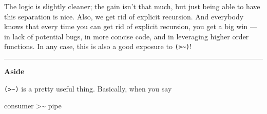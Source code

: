 \documentclass[]{article}
\newenvironment{Shaded}{}{}
\newcommand{\CommentTok}[1]{\textcolor[rgb]{0.38,0.63,0.69}{\textit{#1}}}
\newcommand{\DataTypeTok}[1]{\textcolor[rgb]{0.56,0.13,0.00}{#1}}
\newcommand{\FunctionTok}[1]{\textcolor[rgb]{0.02,0.16,0.49}{#1}}
\newcommand{\KeywordTok}[1]{\textcolor[rgb]{0.00,0.44,0.13}{\textbf{#1}}}
\newcommand{\NormalTok}[1]{#1}
\newcommand{\OperatorTok}[1]{\textcolor[rgb]{0.40,0.40,0.40}{#1}}
\newcommand{\OtherTok}[1]{\textcolor[rgb]{0.00,0.44,0.13}{#1}}
\begin{document}
\begin{Shaded}
\end{Shaded}

The logic is slightly cleaner; the gain isn't that much, but just being able to
have this separation is nice. Also, we get rid of explicit recursion. And
everybody knows that every time you can get rid of explicit recursion, you get a
big win --- in lack of potential bugs, in more concise code, and in leveraging
higher order functions. In any case, this is also a good exposure to
\texttt{(\textgreater{}\textasciitilde{})}!

\begin{center}\rule{0.5\linewidth}{0.5pt}\end{center}

\textbf{Aside}

\texttt{(\textgreater{}\textasciitilde{})} is a pretty useful thing. Basically,
when you say

\begin{Shaded}
\begin{Highlighting}[]
\NormalTok{consumer }\OperatorTok{\textgreater{}\textasciitilde{}}\NormalTok{ pipe}
\end{Highlighting}
\end{Shaded}
\end{document}
